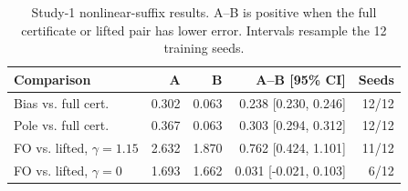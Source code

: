 \begin{table}[t]
\centering
\scriptsize
\begin{tabular}{@{}lrrrr@{}}
\toprule
Comparison & A & B & A--B [95\% CI] & Seeds \\
\midrule
Bias vs. full cert. & 0.302 & 0.063 & 0.238 [0.230, 0.246] & 12/12 \\
Pole vs. full cert. & 0.367 & 0.063 & 0.303 [0.294, 0.312] & 12/12 \\
FO vs. lifted, $\gamma=1.15$ & 2.632 & 1.870 & 0.762 [0.424, 1.101] & 11/12 \\
FO vs. lifted, $\gamma=0$ & 1.693 & 1.662 & 0.031 [-0.021, 0.103] & 6/12 \\
\bottomrule
\end{tabular}
\caption{Study-1 nonlinear-suffix results. A--B is positive when the full certificate or lifted pair has lower error. Intervals resample the 12 training seeds.}
\label{tab:phase5-nonlinear-suffix}
\end{table}
